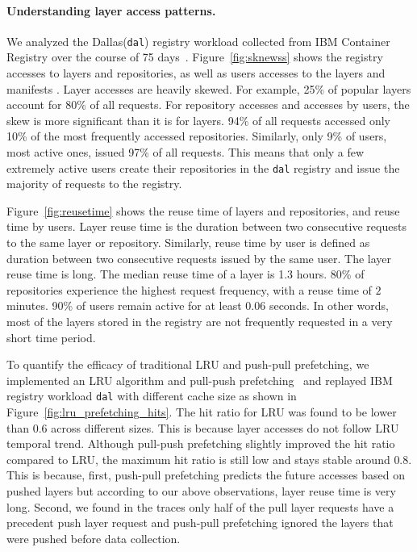 


\paragraph{Understanding layer access patterns.}
We analyzed the Dallas(\texttt{dal}) registry workload collected from IBM Container Registry over the course of 75 days~\cite{dockerworkload}. 
Figure~\ref{fig:sknewss} shows the registry accesses to layers and repositories, as well as users accesses to the layers and manifests . 
Layer accesses are heavily skewed. For example, 25\% of popular layers account for 80\% of all requests. 
For repository accesses and accesses by users, the skew is more significant than it is for layers. %
94\% of all requests accessed only 10\% of the most frequently accessed repositories. Similarly, only 9\% of users, most active ones, issued 97\% of all requests. 
This means that only a few extremely active users create their repositories in the \texttt{dal} registry and issue the majority of requests to the registry.

Figure~\ref{fig:reusetime} shows the reuse time of layers and repositories, and reuse time by users.
Layer reuse time is the duration between two consecutive requests to the same layer or repository. Similarly,
reuse time by user is defined as duration between two consecutive requests issued by the same user. 
The layer reuse time is long.
The median reuse time of a layer is 1.3 hours. 80\% of repositories experience the highest request frequency, with a reuse time of $2$ minutes. 
90\% of users remain active for at least $0.06$ seconds.
In other words, most of the layers stored in the
registry are not frequently requested in a very short
time period.

To quantify the efficacy of traditional LRU and push-pull prefetching,
we implemented an LRU algorithm and pull-push prefetching~\cite{dockerworkload} 
and replayed 
IBM registry workload \texttt{dal} with different cache size as shown in 
Figure~\ref{fig:lru_prefetching_hits}.
The hit ratio for LRU was found to be lower than $0.6$ across different sizes.
This is because layer accesses do not follow LRU temporal trend.
Although pull-push prefetching slightly improved the hit ratio compared to LRU,
the maximum hit ratio is still low and stays stable around $0.8$.
This is because, first, push-pull prefetching predicts the future accesses based on  
pushed layers but according to our above observations, layer reuse time
is very long. 
Second, we found in the traces only half of the pull layer requests have a precedent 
push layer request and push-pull prefetching ignored the layers that were pushed 
before data collection.


